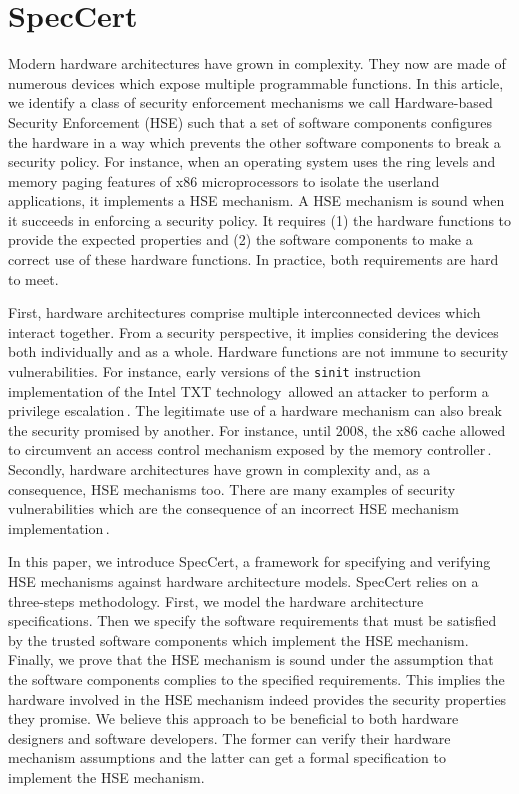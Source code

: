 \chapter{SpecCert}

Modern hardware architectures have grown in complexity.
%
They now are made of numerous devices which expose multiple programmable
functions.
%
In this article, we identify a class of security enforcement mechanisms we call
Hardware-based Security Enforcement (HSE) such that a set of software components
configures the hardware in a way which prevents the other software components to
break a security policy.
%
For instance, when an operating system uses the ring levels and memory paging
features of x86 microprocessors to isolate the userland applications, it
implements a HSE mechanism.
%
A HSE mechanism is sound when it succeeds in enforcing a security policy.
%
It requires (1) the hardware functions to provide the expected properties and
(2) the software components to make a correct use of these hardware functions.
%
In practice, both requirements are hard to meet.

First, hardware architectures comprise multiple interconnected devices which
interact together.
%
From a security perspective, it implies considering the devices both
individually and as a whole.
%
Hardware functions are not immune to security vulnerabilities.
%
For instance, early versions of the \texttt{sinit} instruction implementation of
the Intel TXT technology\,\cite{intel2015txt} allowed an attacker to perform a
privilege escalation\,\cite{wojtczuk2011txtbug}.
%
The legitimate use of a hardware mechanism can also break the security promised
by another.
%
For instance, until 2008, the x86 cache allowed to circumvent an access control
mechanism exposed by the memory
controller\,\cite{wojtczuk2009smram,duflot2009smram}.
%
Secondly, hardware architectures have grown in complexity and, as a consequence,
HSE mechanisms too.
%
There are many examples of security vulnerabilities which are the consequence of
an incorrect HSE mechanism
implementation\,\cite{kallenberg2014failure,bulygin2014bios,intel2014chipsec}.

In this paper, we introduce SpecCert, a framework for specifying and verifying
HSE mechanisms against hardware architecture models.
%
SpecCert relies on a three-steps methodology.
%
First, we model the hardware architecture specifications.
%
Then we specify the software requirements that must be satisfied by the trusted
software components which implement the HSE mechanism.
%
Finally, we prove that the HSE mechanism is sound under the assumption that the
software components complies to the specified requirements.
%
This implies the hardware involved in the HSE mechanism indeed provides the
security properties they promise.
%
We believe this approach to be beneficial to both hardware designers and
software developers.
%
The former can verify their hardware mechanism assumptions and the latter can
get a formal specification to implement the HSE mechanism.

